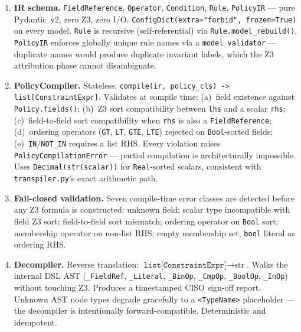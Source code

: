 \documentclass[12pt,a4paper,oneside]{report}
\newcommand{\fname}[1]{\texttt{#1}}          %
\newcommand{\code}[1]{\texttt{#1}}           %
\begin{document}
\begin{enumerate}
  \item \textbf{IR schema.}  \code{FieldReference}, \code{Operator},
        \code{Condition}, \code{Rule}, \code{PolicyIR} --- pure Pydantic~v2,
        zero Z3, zero I/O.  \code{ConfigDict(extra="forbid", frozen=True)}
        on every model.  \code{Rule} is recursive (self-referential) via
        \code{Rule.model\_rebuild()}.  \code{PolicyIR} enforces globally
        unique rule names via a \code{model\_validator} --- duplicate names
        would produce duplicate invariant labels, which the Z3 attribution
        phase cannot disambiguate.

  \item \textbf{PolicyCompiler.}  Stateless;
        \code{compile(ir, policy\_cls) -> list[ConstraintExpr]}.  Validates
        at compile time: (a)~field existence against
        \code{Policy.fields()}; (b)~Z3 sort compatibility between \code{lhs}
        and a scalar \code{rhs}; (c)~field-to-field sort compatibility when
        \code{rhs} is also a \code{FieldReference}; (d)~ordering operators
        (\code{GT}, \code{LT}, \code{GTE}, \code{LTE}) rejected on
        \code{Bool}-sorted fields; (e)~\code{IN}/\code{NOT\_IN} requires a
        list RHS.  Every violation raises \code{PolicyCompilationError} ---
        partial compilation is architecturally impossible.  Uses
        \code{Decimal(str(scalar))} for \code{Real}-sorted scalars,
        consistent with \fname{transpiler.py}'s exact arithmetic path.

  \item \textbf{Fail-closed validation.}  Seven compile-time error classes
        are detected before any Z3 formula is constructed: unknown field;
        scalar type incompatible with field Z3 sort; field-to-field sort
        mismatch; ordering operator on \code{Bool} sort; membership operator
        on non-list RHS; empty membership set; \code{bool} literal as
        ordering RHS.

  \item \textbf{Decompiler.}  Reverse translation:
        $\code{list[ConstraintExpr]} \to \text{str}$.  Walks the internal
        DSL AST (\code{\_FieldRef}, \code{\_Literal}, \code{\_BinOp},
        \code{\_CmpOp}, \code{\_BoolOp}, \code{\_InOp}) without touching Z3.
        Produces a timestamped CISO sign-off report.  Unknown AST node types
        degrade gracefully to a \code{<TypeName>} placeholder --- the
        decompiler is intentionally forward-compatible.  Deterministic and
        idempotent.
\end{enumerate}
\end{document}

